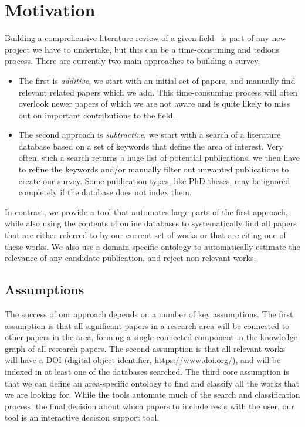 \documentclass[
 hf]{ceurart}
\begin{document}
\section{Motivation}

Building a comprehensive literature review of a given field~\cite{Pautasso2013} is part of any new project we have to undertake, but this can be a time-consuming and tedious process. There are currently two main approaches to building a survey. 
\begin{itemize}
\item The first is \textit{additive}, we start with an initial set of papers, and manually find relevant related papers which we add. This time-consuming process will often overlook newer papers of which we are not aware and is quite likely to miss out on important contributions to the field.
\item The second approach is \textit{subtractive}, we start with a search of a literature database based on a set of keywords that define the area of interest. Very often, such a search returns a huge list of potential publications, we then have to refine the keywords and/or manually filter out unwanted publications to create our survey. Some publication types, like PhD theses, may be ignored completely if the database does not index them.
\end{itemize}

In contrast, we provide a tool that automates large parts of the first approach, while also using the contents of online databases to systematically find all papers that are either referred to by our current set of works or that are citing one of these works. We also use a domain-specific ontology to automatically estimate the relevance of any candidate publication, and reject non-relevant works.

\subsection{Assumptions}
The success of our approach depends on a number of key assumptions. The first assumption is that all significant papers in a research area will be connected to other papers in the area, forming a single connected component in the knowledge graph of all research papers. The second assumption is that all relevant works will have a DOI (digital object identifier, \url{https://www.doi.org/}), and will be indexed in at least one of the databases searched. The third core assumption is that we can define an area-specific ontology to find and classify all the works that we are looking for. While the tools automate much of the search and classification process, the final decision about which papers to include rests with the user, our tool is an interactive decision support tool.
\end{document}
